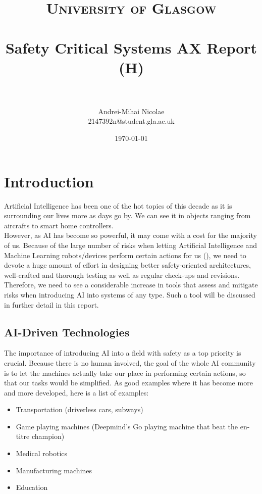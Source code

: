 \documentclass[paper=a4, fontsize=11pt]{scrartcl} %
\title{
\normalfont \normalsize
\textsc{University of Glasgow} \\ [25pt] 
\horrule{0.5pt} \\[0.4cm] %
\huge Safety Critical Systems AX Report (H)\\ 
\horrule{2pt} \\[0.5cm] %
}
\author{Andrei-Mihai Nicolae\\2147392n@student.gla.ac.uk} %
\date{\normalsize\today} %
\numberwithin{equation}{section} %
\numberwithin{figure}{section} %
\numberwithin{table}{section} %
\begin{document}
\maketitle %

\tableofcontents %


\section{Introduction}

\par
Artificial Intelligence has been one of the hot topics of this decade as it is surrounding our lives more as days go by. We can see it in objects ranging from aircrafts to smart home controllers. \\

However, as AI has become so powerful, it may come with a cost for the majority of us. Because of the large number of risks when letting Artificial Intelligence and Machine Learning robots/devices perform certain actions for us (\cite{ai-risks}), we need to devote a huge amount of effort in designing better safety-oriented architectures, well-crafted and thorough testing as well as regular check-ups and revisions. Therefore, we need to see a considerable increase in tools that assess and mitigate risks when introducing AI into systems of any type. Such a tool will be discussed in further detail in this report.


\subsection{AI-Driven Technologies}

\par
The importance of introducing AI into a field with safety as a top priority is crucial. Because there is no human involved, the goal of the whole AI community is to let the machines actually take our place in performing certain actions, so that our tasks would be simplified. As good examples where it has become more and more developed, here is a list of examples:

\begin{itemize}
	\item Transportation (driverless cars, subways)
	\item Game playing machines (Deepmind's Go playing machine that beat the en-titre champion) \citet{deepmind}
	\item Medical robotics
	\item Manufacturing machines
	\item Education
\end{itemize}
\end{document}

